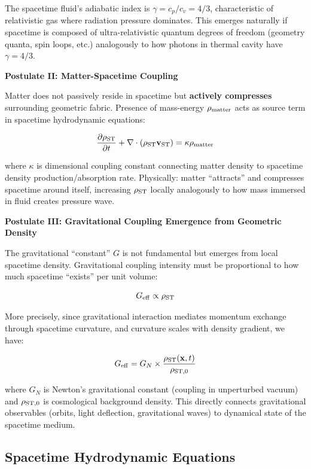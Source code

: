 \documentclass[11pt,a4paper]{article}
\begin{document}
The spacetime fluid's adiabatic index is \(\gamma = c_p/c_v = 4/3\),
characteristic of relativistic gas where radiation pressure dominates.
This emerges naturally if spacetime is composed of ultra-relativistic
quantum degrees of freedom (geometry quanta, spin loops, etc.)
analogously to how photons in thermal cavity have \(\gamma = 4/3\).

\textbf{Postulate II: Matter-Spacetime Coupling}

Matter does not passively reside in spacetime but \textbf{actively
compresses} surrounding geometric fabric. Presence of mass-energy
\(\rho_{\rm matter}\) acts as source term in spacetime hydrodynamic
equations:

\[\frac{\partial \rho_{\rm ST}}{\partial t} + \nabla \cdot (\rho_{\rm ST} {\bf v}_{\rm ST}) = \kappa \rho_{\rm matter}\]

where \(\kappa\) is dimensional coupling constant connecting matter
density to spacetime density production/absorption rate. Physically:
matter ``attracts'' and compresses spacetime around itself, increasing
\(\rho_{\rm ST}\) locally analogously to how mass immersed in fluid
creates pressure wave.

\textbf{Postulate III: Gravitational Coupling Emergence from Geometric
Density}

The gravitational ``constant'' \(G\) is not fundamental but emerges from
local spacetime density. Gravitational coupling intensity must be
proportional to how much spacetime ``exists'' per unit volume:

\[G_{\rm eff} \propto \rho_{\rm ST}\]

More precisely, since gravitational interaction mediates momentum
exchange through spacetime curvature, and curvature scales with density
gradient, we have:

\[G_{\rm eff} = G_N \times \frac{\rho_{\rm ST}({\bf x},t)}{\rho_{\rm ST,0}}\]

where \(G_N\) is Newton's gravitational constant (coupling in
unperturbed vacuum) and \(\rho_{\rm ST,0}\) is cosmological background
density. This directly connects gravitational observables (orbits, light
deflection, gravitational waves) to dynamical state of the spacetime
medium.

\hypertarget{spacetime-hydrodynamic-equations}{%
\subsection{Spacetime Hydrodynamic
Equations}\label{spacetime-hydrodynamic-equations}}
\end{document}
